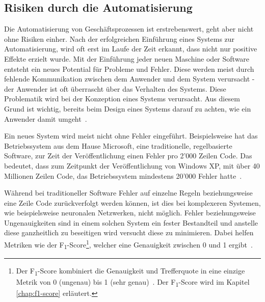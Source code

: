 \subsection{Risiken durch die Automatisierung}




Die Automatisierung von Geschäftsprozessen ist erstrebenswert, geht aber nicht ohne Risiken einher.
Nach der erfolgreichen Einführung eines Systems zur Automatisierung, wird oft erst im Laufe der Zeit erkannt, dass nicht nur positive Effekte erzielt wurde. Mit der Einführung jeder neuen Maschine oder Software entsteht ein neues Potential für Probleme und Fehler. Diese werden meist durch fehlende Kommunikation zwischen dem Anwender und dem System verursacht - der Anwender ist oft überrascht über das Verhalten des Systems. Diese Problematik wird bei der Konzeption eines Systems verursacht. Aus diesem Grund ist wichtig, bereits beim Design eines Systems darauf zu achten, wie ein Anwender damit umgeht~\autocite{Sarter1997}. 

Ein neues System wird meist nicht ohne Fehler eingeführt. Beispielsweise hat das Betriebssystem aus dem Hause Microsoft, eine traditionelle, regelbasierte Software, zur Zeit der Veröffentlichung einen Fehler pro 2'000 Zeilen Code. Das bedeutet, dass zum Zeitpunkt der Veröffentlichung von Windows XP, mit über 40 Millionen Zeilen Code, das Betriebssystem mindestens 20'000 Fehler hatte~\autocite{TheEconomist2010}. 

Während bei traditioneller Software Fehler auf einzelne Regeln beziehungsweise eine Zeile Code zurückverfolgt werden können, ist dies bei komplexeren Systemen, wie beispielsweise neuronalen Netzwerken, nicht möglich. Fehler beziehungsweise Ungenauigkeiten sind in einem solchen System ein fester Bestandteil und anstelle diese ganzheitlich zu beseitigen wird versucht diese zu minimieren. Dabei helfen Metriken wie der F\textsubscript{1}-Score\footnote{Der F\textsubscript{1}-Score kombiniert die Genauigkeit und Trefferquote in eine einzige Metrik von 0 (ungenau) bis 1 (sehr genau)~\autocite{VanRijsbergen1979}. Der F\textsubscript{1}-Score wird im Kapitel \ref{chap:f1-score} erläutert.}, welcher eine Genauigkeit zwischen 0 und 1 ergibt~\autocite{VanRijsbergen1979}.

